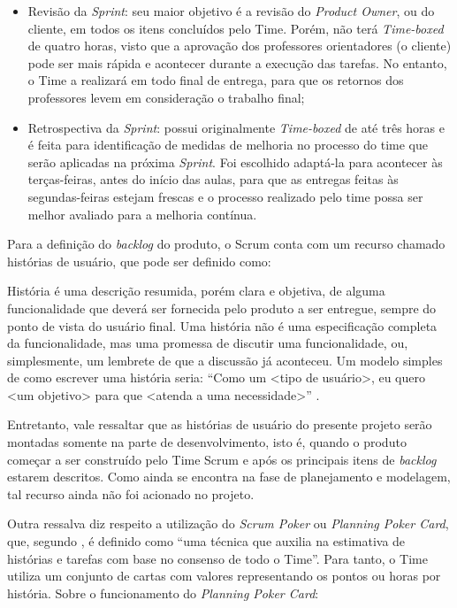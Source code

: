 \begin{itemize}
\item Revisão da \textsl{Sprint}: seu maior objetivo é a revisão do \textsl{Product Owner}, ou do cliente, em todos os itens concluídos pelo Time. Porém, 
não terá \textsl{Time-boxed} de quatro horas, visto que a aprovação dos professores orientadores (o cliente) pode ser mais rápida e acontecer durante a execução das tarefas. No entanto, o Time a realizará em todo final de entrega, para que os retornos dos professores levem em consideração o trabalho final;

\item Retrospectiva da \textsl{Sprint}: possui originalmente \textsl{Time-boxed} de até três horas e é feita para identificação 
de medidas de melhoria no processo do time que serão aplicadas na próxima \textsl{Sprint}. Foi escolhido adaptá-la para acontecer às terças-feiras, antes do início das aulas, para que as entregas feitas às segundas-feiras estejam frescas e o processo realizado pelo time possa ser melhor avaliado para a melhoria contínua.
\end{itemize}

Para a definição do \textsl{backlog} do produto, o Scrum conta com um recurso chamado histórias de usuário, que pode ser definido como: 

\begin{citacao}
História é uma descrição resumida, porém clara e objetiva, de alguma funcionalidade que deverá ser fornecida pelo produto a ser entregue, sempre do ponto de vista do usuário final. Uma história não é uma especificação completa da funcionalidade, mas uma promessa de discutir uma funcionalidade, ou, simplesmente, um lembrete de que a discussão já aconteceu. Um modelo simples de como escrever uma história seria: ``Como um <tipo de usuário>, eu quero <um objetivo> para que <atenda a uma necessidade>'' \cite{cruz:2018}.
\end{citacao}

Entretanto, vale ressaltar que as histórias de usuário do presente projeto serão montadas somente na parte de desenvolvimento, isto é, quando o produto começar a ser construído pelo Time Scrum e após os principais itens de \textsl{backlog} estarem descritos. Como ainda se encontra na fase de planejamento e modelagem, tal recurso ainda não foi acionado no projeto.

Outra ressalva diz respeito a utilização do \textsl{Scrum Poker} ou \textsl{Planning Poker Card}, que, segundo , é definido como ``uma técnica que auxilia na estimativa de histórias e tarefas com base no consenso de todo o Time''. Para tanto, o Time utiliza um conjunto de cartas com valores representando os pontos ou horas por história. Sobre o funcionamento do \textsl{Planning Poker Card}:

